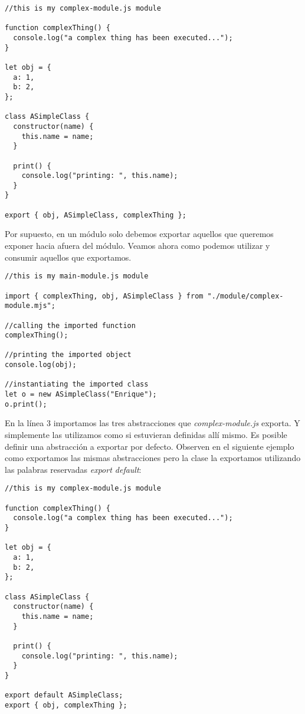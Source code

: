 \documentclass[a4paper, oneside, titlepage, 12pt]{book}
\begin{document}
\begin{verbatim}
//this is my complex-module.js module

function complexThing() {
  console.log("a complex thing has been executed...");
}

let obj = {
  a: 1,
  b: 2,
};

class ASimpleClass {
  constructor(name) {
    this.name = name;
  }

  print() {
    console.log("printing: ", this.name);
  }
}

export { obj, ASimpleClass, complexThing };
\end{verbatim}

Por supuesto, en un módulo solo debemos exportar aquellos que queremos exponer hacia afuera del módulo. Veamos ahora como podemos utilizar y consumir aquellos que exportamos.

\begin{verbatim}
//this is my main-module.js module

import { complexThing, obj, ASimpleClass } from "./module/complex-module.mjs";

//calling the imported function
complexThing();

//printing the imported object
console.log(obj);

//instantiating the imported class
let o = new ASimpleClass("Enrique");
o.print();
\end{verbatim}

En la línea 3 importamos las tres abstracciones que \textit{complex-module.js} exporta. Y simplemente las utilizamos como si estuvieran definidas allí mismo. Es posible definir una abstracción a exportar por defecto. Observen en el siguiente ejemplo como exportamos las mismas abstracciones pero la clase la exportamos utilizando las palabras reservadas \textit{export default}:

\begin{verbatim}
//this is my complex-module.js module

function complexThing() {
  console.log("a complex thing has been executed...");
}

let obj = {
  a: 1,
  b: 2,
};

class ASimpleClass {
  constructor(name) {
    this.name = name;
  }

  print() {
    console.log("printing: ", this.name);
  }
}

export default ASimpleClass;
export { obj, complexThing };
\end{verbatim}
\end{document}
